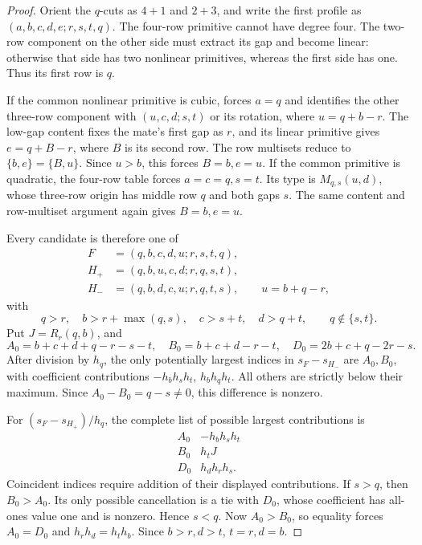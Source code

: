 \documentclass[11pt,a4paper]{amsart}
\numberwithin{equation}{section}
\theoremstyle{plain}
\theoremstyle{definition}
\begin{document}
\begin{proof}
Orient the \(q\)-cuts as \(4+1\) and \(2+3\), and write the first
profile as \((a,b,c,d,e;r,s,t,q)\).  The four-row primitive cannot
have degree four.  The two-row component on the other side must extract
its gap and become linear: otherwise that side has two nonlinear
primitives, whereas the first side has one.  Thus its first row is \(q\).

If the common nonlinear primitive is cubic,
 forces \(a=q\) and identifies the
other three-row component with
\((u,c,d;s,t)\) or its rotation, where \(u=q+b-r\).
The low-gap content fixes the mate's first gap as \(r\), and its linear
primitive gives \(e=q+B-r\), where \(B\) is its second row.
The row multisets reduce to \(\{b,e\}=\{B,u\}\).  Since \(u>b\),
this forces \(B=b,e=u\).
If the common primitive is quadratic, the four-row table forces
\(a=c=q,s=t\).  Its type is \(M_{q,s}(u,d)\), whose three-row
origin has middle row \(q\) and both gaps \(s\).
The same content and row-multiset argument again gives \(B=b,e=u\).

Every candidate is therefore one of
\begin{align*}
 F&=(q,b,c,d,u;r,s,t,q),\\
 H_+&=(q,b,u,c,d;r,q,s,t),\\
 H_-&=(q,b,d,c,u;r,q,t,s),\qquad u=b+q-r,
\end{align*}
with
\[
 q>r,\quad b>r+\max(q,s),\quad c>s+t,\quad d>q+t,
 \qquad q\notin\{s,t\}.
\]
Put \(J=R_r(q,b)\), and
\[
 A_0=b+c+d+q-r-s-t,\quad B_0=b+c+d-r-t,
 \quad D_0=2b+c+q-2r-s.
\]
After division by \(h_q\), the only potentially largest indices in
\(s_F-s_{H_-}\) are \(A_0,B_0\), with coefficient contributions
\(-h_bh_sh_t\), \(h_bh_qh_t\).  All others are strictly below their
maximum.  Since \(A_0-B_0=q-s\ne0\), this difference is nonzero.

For \((s_F-s_{H_+})/h_q\), the complete list of possible largest
contributions is
\[
\begin{array}{c|c}
 A_0&-h_bh_sh_t\\ B_0&h_tJ\\ D_0&h_dh_rh_s.
\end{array}
\]
Coincident indices require addition of their displayed contributions.
If \(s>q\), then \(B_0>A_0\).  Its only possible cancellation is a
tie with \(D_0\), whose coefficient has all-ones value one and is
nonzero.  Hence \(s<q\).  Now \(A_0>B_0\), so equality forces
\(A_0=D_0\) and \(h_rh_d=h_th_b\).  Since \(b>r,d>t\),
\(t=r,d=b\).


\end{proof}
\end{document}
